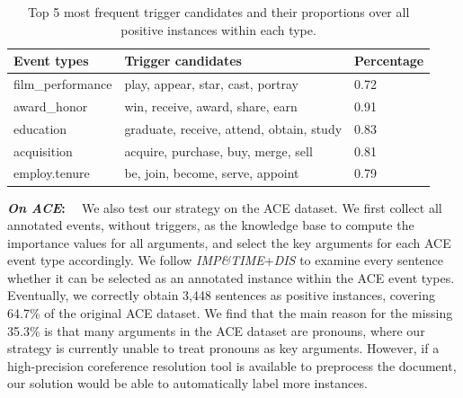 \begin{table}
	\scriptsize
	\centering
	\begin{tabular}{lll}
    \toprule
		\textbf{Event types} & \textbf{Trigger candidates} & \textbf{Percentage} \\
    \midrule
		\rowcolor{Gray}film\_performance & play, appear, star, cast, portray & 0.72 \\
		award\_honor & win, receive, award, share, earn & 0.91 \\
		\rowcolor{Gray}education & graduate, receive, attend, obtain, study & 0.83 \\
		acquisition & acquire, purchase, buy, merge, sell & 0.81 \\
		\rowcolor{Gray}employ.tenure & be, join, become, serve, appoint & 0.79 \\
    \bottomrule
	\end{tabular}
    \vspace{-2mm}
	\caption{Top 5 most frequent trigger candidates and their proportions over all positive instances within each type.}
    \vspace{-3mm}
	\label{freqTriggers}
\end{table}

\vspace{2mm} \noindent\textbf{\emph{On ACE}: \mbox{ }} We also test our strategy on the ACE dataset. We first collect all annotated events,
without triggers, as the knowledge base to compute the importance values for all arguments, and select the key arguments for each ACE event
type accordingly. We follow \emph{IMP\&TIME}+\emph{DIS} to examine every sentence whether it can be selected as an annotated instance
within the ACE event types. Eventually, we correctly obtain 3,448 sentences as positive instances, covering 64.7\% of the original ACE
dataset.  We find that the main reason for the missing 35.3\% is that many arguments in the ACE dataset are pronouns, where our strategy is
currently unable to treat pronouns as key arguments. However, if a high-precision coreference resolution tool is available to preprocess
the document,
our solution would be able to automatically label more instances.%

